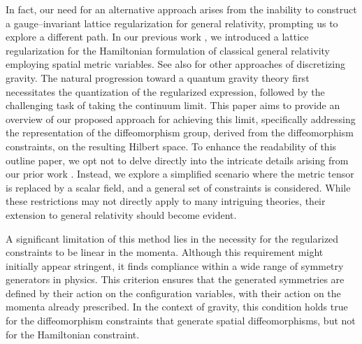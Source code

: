 In fact, our need for an alternative approach arises from the inability to construct a gauge--invariant lattice regularization for general relativity, prompting us to explore a different path. 
In our previous work \parencite{lattice}, we introduced a lattice regularization for the Hamiltonian formulation of classical general relativity employing spatial metric variables. 
See also \textcite{Regge,spinfoams,CDT} for other approaches of discretizing gravity.
The natural progression toward a quantum gravity theory first necessitates the quantization of the regularized expression, followed by the challenging task of taking the continuum limit. 
This paper aims to provide an overview of our proposed approach for achieving this limit, specifically addressing the representation of the diffeomorphism group, derived from the diffeomorphism constraints, on the resulting Hilbert space.
To enhance the readability of this outline paper, we opt not to delve directly into the intricate details arising from our prior work \parencite{lattice}. 
Instead, we explore a simplified scenario where the metric tensor is replaced by a scalar field, and a general set of constraints is considered. 
While these restrictions may not directly apply to many intriguing theories, their extension to general relativity should become evident.

A significant limitation of this method lies in the necessity for the regularized constraints to be linear in the momenta.
Although this requirement might initially appear stringent, it finds compliance within a wide range of symmetry generators in physics.
This criterion ensures that the generated symmetries are defined by their action on the configuration variables, with their action on the momenta already prescribed.
In the context of gravity, this condition holds true for the diffeomorphism constraints that generate spatial diffeomorphisms, but not for the Hamiltonian constraint. 

